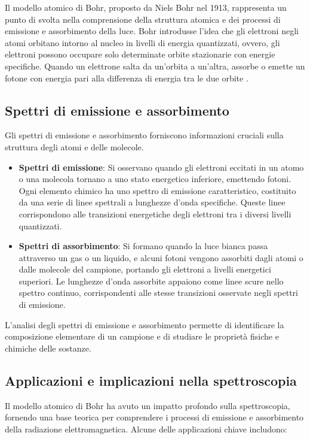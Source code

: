 \documentclass[12pt,a4paper]{report}
\begin{document}
Il modello atomico di Bohr, proposto da Niels Bohr nel 1913, rappresenta un punto di svolta nella comprensione della struttura atomica e dei processi di emissione e assorbimento della luce. Bohr introdusse l'idea che gli elettroni negli atomi orbitano intorno al nucleo in livelli di energia quantizzati, ovvero, gli elettroni possono occupare solo determinate orbite stazionarie con energie specifiche. Quando un elettrone salta da un'orbita a un'altra, assorbe o emette un fotone con energia pari alla differenza di energia tra le due orbite \cite{bohr1913constitution}.

\subsection{Spettri di emissione e assorbimento}

Gli spettri di emissione e assorbimento forniscono informazioni cruciali sulla struttura degli atomi e delle molecole.

\begin{itemize}
\item \textbf{Spettri di emissione}: Si osservano quando gli elettroni eccitati in un atomo o una molecola tornano a uno stato energetico inferiore, emettendo fotoni. Ogni elemento chimico ha uno spettro di emissione caratteristico, costituito da una serie di linee spettrali a lunghezze d'onda specifiche. Queste linee corrispondono alle transizioni energetiche degli elettroni tra i diversi livelli quantizzati.
\item \textbf{Spettri di assorbimento}: Si formano quando la luce bianca passa attraverso un gas o un liquido, e alcuni fotoni vengono assorbiti dagli atomi o dalle molecole del campione, portando gli elettroni a livelli energetici superiori. Le lunghezze d'onda assorbite appaiono come linee scure nello spettro continuo, corrispondenti alle stesse transizioni osservate negli spettri di emissione.
\end{itemize}

L'analisi degli spettri di emissione e assorbimento permette di identificare la composizione elementare di un campione e di studiare le proprietà fisiche e chimiche delle sostanze.

\subsection{Applicazioni e implicazioni nella spettroscopia}

Il modello atomico di Bohr ha avuto un impatto profondo sulla spettroscopia, fornendo una base teorica per comprendere i processi di emissione e assorbimento della radiazione elettromagnetica. Alcune delle applicazioni chiave includono:
\end{document}
